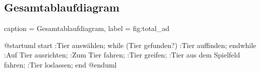 \subsection{Gesamtablaufdiagram}

\begin{dhbwfigure}{%
    caption	= Gesamtablaufdiagram,
    label	= fig:total_ad
}

\begin{plantuml}
    @startuml
    start
    :Tier auswählen;
    while (Tier gefunden?)
        :Tier auffinden;
    endwhile
    :Auf Tier ausrichten;
    :Zum Tier fahren;
    :Tier greifen;
    :Tier aus dem Spielfeld fahren;
    :Tier loslassen;
    end
    @enduml
\end{plantuml}
    
\end{dhbwfigure}